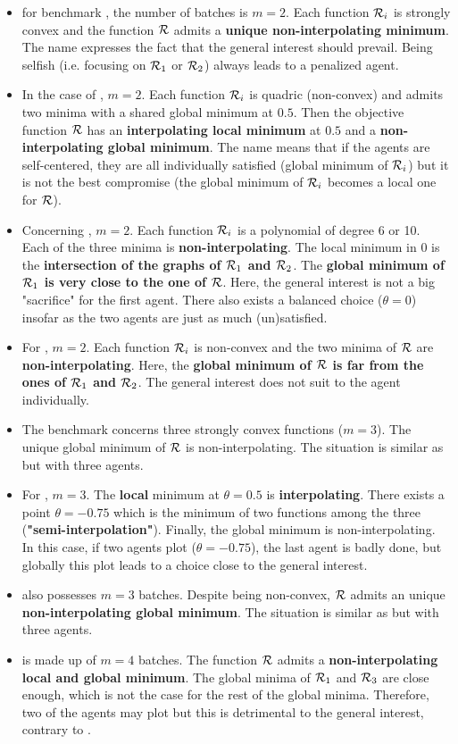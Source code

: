 \documentclass[article,authoryear,jmlmc]{beg_32}             %
\begin{document}
\begin{itemize}
	\item for benchmark \exOne, the number of batches is $m=2$. Each function $\mathcal{R}_i$ is strongly convex and the function $\mathcal{R}$ admits a \textbf{unique non-interpolating minimum}. The name
          expresses the fact that the general interest should prevail. 
          Being selfish (i.e. focusing on $\mathcal{R}_1$ or $\mathcal{R}_2$)  always leads to a penalized agent.
	\item In the case of \exTwo, $m=2$. Each function $\mathcal{R}_i$ is quadric (non-convex) and admits two minima with a shared global minimum at $0.5$. Then the objective function
          $\mathcal{R}$ has an \textbf{interpolating local minimum} at $0.5$ and a \textbf{non-interpolating global minimum}. The name means that if the agents are self-centered, they are all individually satisfied (global minimum of $\mathcal{R}_i$) but it is not the best compromise (the global minimum of $\mathcal{R}_i$ becomes a local one for $\mathcal{R}$).
	\item Concerning \exThree, $m=2$. Each function $\mathcal{R}_i$ is a polynomial of degree 6 or 10. Each of the three minima is \textbf{non-interpolating}. The local minimum in 0
          is the \textbf{intersection of the graphs of $\mathcal{R}_1$ and $\mathcal{R}_2$}. The \textbf{global minimum of $\mathcal{R}_1$ is very close to the one of $\mathcal{R}$}. Here, the general interest is not a big "sacrifice" for the first agent. There also exists a balanced choice ($\theta=0$) insofar as the two agents are just as much (un)satisfied. 
	\item For \exFour, $m=2$. Each function $\mathcal{R}_i$ is non-convex and the two minima of $\mathcal{R}$ are \textbf{non-interpolating}. Here, the \textbf{global minimum of $\mathcal{R}$ is far from the ones of $\mathcal{R}_1$ and $\mathcal{R}_2$}. The general interest does not suit to the agent individually. 
	\item The benchmark \exFive concerns three strongly convex functions ($m=3$). The unique global minimum of $\mathcal{R}$ is non-interpolating. The situation is similar as \exOne but with three agents.
	\item For \exSix, $m=3$. The \textbf{local} minimum at $\theta=0.5$ is \textbf{interpolating}. There exists a point $\theta=-0.75$ which is the minimum of two functions among the three (\textbf{"semi-interpolation"}). Finally, the global minimum is non-interpolating. In this case, if two agents plot ($\theta=-0.75$), the last agent is badly done, but globally this plot leads to a choice close to the general interest. 
	\item \exSeven also possesses $m=3$ batches. Despite being non-convex, $\mathcal{R}$ admits an unique \textbf{non-interpolating global minimum}. The situation is similar as \exFour but with three agents.
	\item \exHeight is made up of $m=4$ batches. The function $\mathcal{R}$ admits a \textbf{non-interpolating local and global minimum}. The global minima of $\mathcal{R}_1$ and $\mathcal{R}_3$ are close enough, which is not the case for the rest of the global minima. Therefore, two of the agents may plot but this is detrimental to the general interest, contrary to \exSix.      
\end{itemize}
\end{document}
